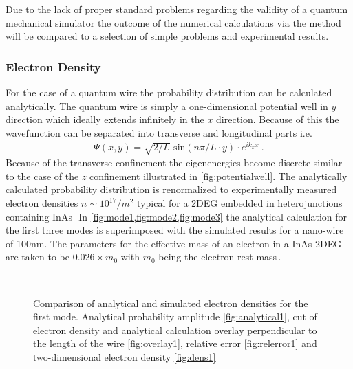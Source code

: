 Due to the lack of proper standard problems regarding the validity of a quantum mechanical simulator the outcome of the numerical calculations via the \gfnc{} method will be compared to a selection of simple problems and experimental results.\par
\subsubsection{Electron Density}
For the case of a quantum wire the probability distribution can be calculated analytically. The quantum wire is simply a one-dimensional potential well in $y$ direction which ideally extends infinitely in the $x$ direction.
Because of this the wavefunction can be separated into transverse and longitudinal parts i.e.
\begin{align}
\Psi(x,y) = \sqrt{2/L}\text{ sin}(n\pi/L \cdot y) \cdot e^{ik_xx}\ .
\end{align}
Because of the transverse confinement the eigenenergies become discrete similar to the case of the $z$ confinement illustrated in \cref{fig:potentialwell}.
The analytically calculated probability distribution is renormalized to experimentally measured electron densities $n \sim 10^{17}/m^2$ typical for a 2DEG embedded in heterojunctions containing InAs\,\cite{gelfand2006}\,\cite{JJAP.26.L59}
In \cref{fig:mode1,fig:mode2,fig:mode3} the analytical calculation for the first three modes is superimposed with the simulated results for a nano-wire of 100nm. 
The parameters for the effective mass of an electron in a InAs 2DEG are taken to be $0.026\times m_0$ with $m_0$ being the electron rest mass\,\cite{PhysRev.105.460}.\par
\begin{figure}[h!]
  \begin{center}
 \qquad
    \\
    \qquad
    \caption{Comparison of analytical and simulated electron densities for the first mode. Analytical probability amplitude \ref{fig:analytical1}, cut of electron density and analytical calculation overlay perpendicular to the length of the wire \ref{fig:overlay1}, relative error \ref{fig:relerror1} and two-dimensional electron density \ref{fig:dens1}}\label{fig:mode1}
  \end{center}
\end{figure}
